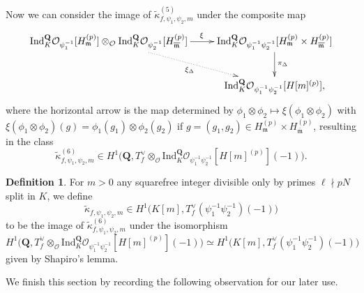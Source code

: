 \documentclass[10pt,letterpaper]{amsart}
\theoremstyle{plain}
\theoremstyle{definition}
\newtheorem{defn}[thm]{Definition}
\theoremstyle{definition}
\theoremstyle{plain}
\theoremstyle{plain}
\theoremstyle{plain}
\theoremstyle{remark}
\numberwithin{equation}{section}
\newcommand{\fkm}{\mathfrak{m}}
\newcommand{\fkmbar}{\overline{\mathfrak{m}}}
\newcommand{\Q}{\mathbf{Q}}
\begin{document}

Now we can consider the image of $\tilde{\kappa}_{f,\psi_1,\psi_2,m}^{(5)}$ under the composite map
\begin{equation}\label{ind2}
\begin{aligned}
     \xymatrix{
\text{Ind}^{\Q}_{K}\mathcal{O}_{\psi_{1}^{-1}}[H_{\fkm}^{(p)}]\otimes_{\mathcal{O}}\text{Ind}^{\Q}_{K}\mathcal{O}_{\psi_{2}^{-1}}[H_{\fkmbar}^{(p)}] \ar@{..>}[dr]_{\xi_\Delta} \ar[r]^(.56){\xi} & \text{Ind}^{\Q}_{K}\mathcal{O}_{\psi_{1}^{-1}\psi_{2}^{-1}}[H_{\fkm}^{(p)}\times H_{\fkmbar}^{(p)}] \ar[d]^{\pi_\Delta} \\
 & \text{Ind}^{\Q}_{K}\mathcal{O}_{\psi_{1}^{-1}\psi_{2}^{-1}}[H[m]^{(p)}], }
 \end{aligned}
\end{equation}
where the horizontal arrow is the map determined by $\phi_1\otimes \phi_2\mapsto\xi(\phi_1\otimes \phi_2)$ with $\xi(\phi_1\otimes\phi_2)(g)=\phi_1(g_1)\otimes \phi_2(g_2)$ if $g=(g_1,g_2)\in H_{\fkm}^{(p)}\times H_{\fkmbar}^{(p)}$, resulting in the class 
\[
\tilde{\kappa}_{f,\psi_1,\psi_2,m}^{(6)}\in H^1\bigl(\Q,T_f^{\vee}\otimes_{\mathcal{O}}\text{Ind}^{\Q}_{K}\mathcal{O}_{\psi_{1}^{-1}\psi_{2}^{-1}}[H[m]^{(p)}](-1)\bigr).
\]

\begin{defn}\label{def:tame-classes}
For $m>0$ any squarefree integer divisible only by primes $\ell\nmid pN$ split in $K$, we define
\[
\tilde{\kappa}_{f,\psi_1,\psi_2,m}\in H^1\bigl(K[m],T_f^{\vee}(\psi_{1}^{-1}\psi_{2}^{-1})(-1)\bigr)
\]
to be the image of $\tilde{\kappa}_{f,\psi_1,\psi_2,m}^{(6)}$ under the isomorphism 
\[H^1\bigl(\Q,T_f^{\vee}\otimes_{\mathcal{O}}\text{Ind}^{\Q}_{K}\mathcal{O}_{\psi_{1}^{-1}\psi_{2}^{-1}}[H[m]^{(p)}](-1)\bigr)\simeq H^1\bigl(K[m],T_f^{\vee}(\psi_{1}^{-1}\psi_{2}^{-1})(-1)\bigr)
\]
given by Shapiro's lemma.
\end{defn}

We finish this section by recording the following observation for our later use.
\end{document}
